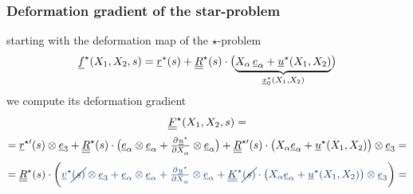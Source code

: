 \begin{frame}
  \frametitle{Deformation gradient of the star-problem}

  starting with the deformation map of the $\star$-problem
  \begin{displaymath}
    \underline{f}^{\star}(X_1,X_2,s) =
    \underline{r}^{\star}(s) + 
    \underline{\underline{R}}^{\star}(s) \cdot \bigl( \underbrace{ X_{\alpha} \, \underline{e}_{\alpha} + \underline{u}^{\star}(X_1,X_2) }_{\underline{x}_0^{\star}(X_1,X_2)} \bigr)
  \end{displaymath}
  we compute its deformation gradient
  \vspace{0.3em}
  \begin{displaymath}
    \underline{\underline{F}}^{\star}(X_1,X_2,s) =
  \end{displaymath}
  \begin{displaymath}
    = \underline{r}^{\star \prime}(s) \otimes \underline{e}_3 +
      \doubleunderline{R}^{\star}(s) \cdot \bigl( \underline{e}_{\alpha} \otimes \underline{e}_{\alpha} +
      \pd{\underline{u}^{\star}}{X_{\alpha}} \otimes \underline{e}_{\alpha} \bigr) +
      \doubleunderline{R}^{\star \prime}(s) \cdot \bigl( X_{\alpha} \underline{e}_{\alpha} + \underline{u}^{\star}(X_1,X_2) \bigr) \otimes \underline{e}_3 =
  \end{displaymath}
  \begin{displaymath}
    = \doubleunderline{R}^{\star}(s) \cdot \biggl( {\color{faublue}
        \underline{v}^{\star}\cancel{(s)} \otimes \underline{e}_3 +
        \underline{e}_{\alpha} \otimes \underline{e}_{\alpha} + 
        \pd{\underline{u}^{\star}}{X_{\alpha}} \otimes \underline{e}_{\alpha} +
        \doubleunderline{K}^{\star}\cancel{(s)} \cdot \bigl( X_{\alpha} \underline{e}_{\alpha} + \underline{u}^{\star}(X_1,X_2) \bigr) \otimes \underline{e}_3 }
      \biggr) =
  \end{displaymath}

\end{frame}
